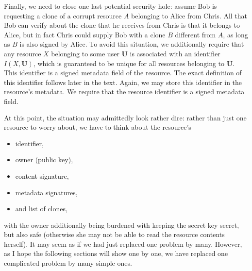 \documentclass[11pt]{article}
\begin{document}
\begin{mainmatter}
Finally, we need to close one last potential security hole: assume Bob is requesting a clone of a corrupt resource $A$ belonging to Alice from Chris. All that Bob can verify about the clone that he receives from Chris is that it belongs to Alice, but in fact Chris could supply Bob with a clone $B$ different from $A$, as long as $B$ is also signed by Alice. To avoid this situation, we additionally require that any resource $X$ belonging to some user $\mathbf U$ is associated with an identifier $I(X, \mathbf U)$, which is guaranteed to be unique for all resources belonging to $\mathbf U$. This identifier is a signed metadata field of the resource. The exact definition of this identifier follows later in the text. Again, we may store this identifier in the resource's metadata. We require that the resource identifier is a signed metadata field.

At this point, the situation may admittedly look rather dire: rather than just one resource to worry about, we have to think about the resource's 
\begin{itemize}
\item identifier, 
\item owner (public key), 
\item content signature,
\item metadata signatures,
\item and list of clones,
\end{itemize} 
with the owner additionally being burdened with keeping the secret key secret, but also safe (otherwise she may not be able to read the resource contents herself). It may seem as if we had just replaced one problem by many. However, as I hope the following sections will show one by one, we have replaced one complicated problem by many simple ones.


\end{mainmatter}
\end{document}
